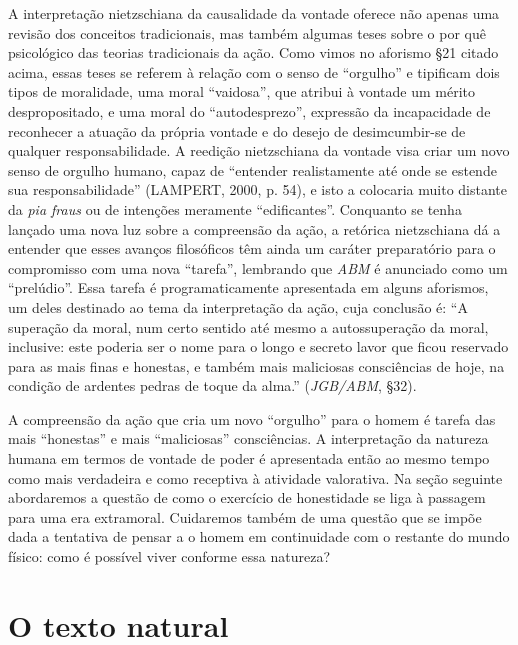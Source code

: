 \documentclass[
	12pt,				%
	openright,			%
	oneside,			%
	a4paper,			%
	english,			%
	french,				%
	spanish,			%
	brazil				%
	]{abntex2}
\begin{document}
A interpretação nietzschiana da causalidade da vontade oferece não apenas uma revisão dos conceitos tradicionais, mas também algumas teses sobre o por quê psicológico das teorias tradicionais da ação. Como vimos no aforismo §21 citado acima, essas teses se referem à relação  com o senso de “orgulho” e tipificam dois tipos de moralidade, uma moral “vaidosa”, que atribui à vontade um mérito despropositado, e uma moral do “autodesprezo”, expressão da incapacidade de reconhecer a atuação da própria vontade e do desejo de desimcumbir-se de qualquer responsabilidade. A reedição nietzschiana da vontade visa criar um novo senso de orgulho humano, capaz de “entender realistamente até onde se estende sua responsabilidade” (LAMPERT, 2000, p. 54), e isto a colocaria muito distante da \textit{pia fraus} ou de intenções meramente “edificantes”. Conquanto se tenha lançado uma nova luz sobre a compreensão da ação, a retórica nietzschiana dá a entender que esses avanços filosóficos têm ainda um caráter preparatório para o compromisso com uma nova “tarefa”, lembrando que \textit{ABM} é anunciado como um “prelúdio”. Essa tarefa é programaticamente apresentada em alguns aforismos, um deles destinado ao tema da interpretação da ação, cuja conclusão é: “A superação da moral, num certo sentido até mesmo a autossuperação da moral, inclusive: este poderia ser o nome para o longo e secreto lavor que ficou reservado para as mais finas e honestas, e também mais maliciosas consciências de hoje, na condição de ardentes pedras de toque da alma.” (\textit{JGB/ABM}, §32).  

A compreensão da ação que cria um novo “orgulho” para o homem é tarefa das mais “honestas” e mais “maliciosas” consciências. A interpretação da natureza humana em termos de vontade de poder é apresentada então ao mesmo tempo como mais verdadeira e como receptiva à atividade valorativa. Na seção seguinte abordaremos a questão de como o exercício de honestidade se liga à passagem para uma era extramoral. Cuidaremos também de uma questão que se impõe dada a tentativa de pensar a o homem em continuidade com o restante do mundo físico: como é possível viver conforme essa natureza?

\section{O texto natural}
\end{document}
